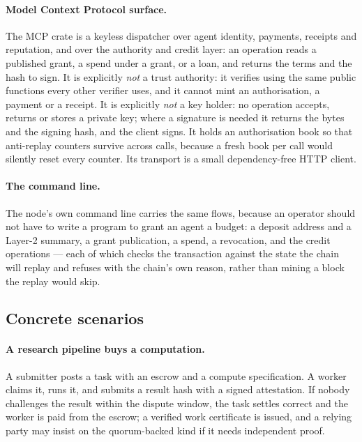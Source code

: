 \documentclass{article}
\begin{document}
\paragraph{Model Context Protocol surface.} The MCP crate is a keyless
dispatcher over agent identity, payments, receipts and reputation, and over the
authority and credit layer: an operation reads a published grant, a spend under
a grant, or a loan, and returns the terms and the hash to sign. It is
explicitly \emph{not} a trust authority: it verifies using the same public
functions every other verifier uses, and it cannot mint an authorisation, a
payment or a receipt. It is explicitly \emph{not} a key holder: no operation
accepts, returns or stores a private key; where a signature is needed it
returns the bytes and the signing hash, and the client signs. It holds an
authorisation book so that anti-replay counters survive across calls, because
a fresh book per call would silently reset every counter. Its transport is a
small dependency-free HTTP client.

\paragraph{The command line.} The node's own command line carries the same
flows, because an operator should not have to write a program to grant an
agent a budget: a deposit address and a Layer-2 summary, a grant publication,
a spend, a revocation, and the credit operations --- each of which checks the
transaction against the state the chain will replay and refuses with the
chain's own reason, rather than mining a block the replay would skip.

\subsection{Concrete scenarios}

\paragraph{A research pipeline buys a computation.} A submitter posts a task
with an escrow and a compute specification. A worker claims it, runs it, and
submits a result hash with a signed attestation. If nobody challenges the
result within the dispute window, the task settles correct and the worker is
paid from the escrow; a verified work certificate is issued, and a relying
party may insist on the quorum-backed kind if it needs independent proof.
\end{document}
